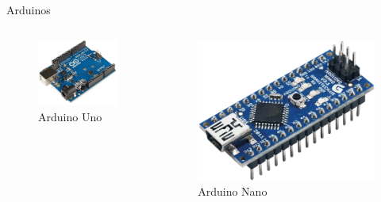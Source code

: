 \begin{frame}{Arduinos}

	\begin{minipage}[0.3\textheight]{\textwidth}
	\begin{columns}[T]
	\begin{column}{0.5\textwidth}
		\begin{figure}
	 	 \includegraphics[width=1\textwidth,height=1\textheight,keepaspectratio]{figures/Arduino_Uno.jpg}
	 	 \caption{Arduino Uno}
	 	 \end{figure}
	\end{column}
	\begin{column}{0.5\textwidth}

	 
	 \vspace{2 mm}
	  \begin{figure}
	  \includegraphics[width=1\textwidth,height=1\textheight,keepaspectratio]{figures/Arduino_Nano.png}
	  \caption{Arduino Nano}
	  \end{figure}
	\end{column}
	\end{columns}
	
  \end{minipage}
\end{frame}

